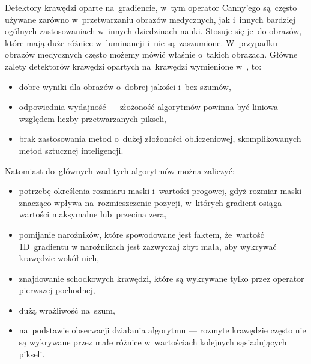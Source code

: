 \documentclass[a4paper,11pt,twoside,openright]{report}
\theoremstyle{definition}
\begin{document}
Detektory krawędzi oparte na~gradiencie, w~tym operator Canny'ego są~często używane
zarówno w~przetwarzaniu obrazów medycznych, jak i~innych bardziej ogólnych zastosowaniach
w~innych dziedzinach nauki. Stosuje się je~do obrazów, które mają duże różnice w~luminancji i~nie
są~zaszumione. W~przypadku obrazów medycznych często możemy mówić właśnie o~takich obrazach.
Główne zalety detektorów krawędzi opartych na~krawędzi
wymienione w~\cite{Cyfrowe przetwarzanie obrazów medycznych}, to:
\begin{itemize}[noitemsep]
\item dobre wyniki dla obrazów o~dobrej jakości i~bez szumów,
\item odpowiednia wydajność --- złożoność algorytmów powinna być liniowa względem liczby przetwarzanych pikseli,
\item brak zastosowania metod o~dużej złożoności obliczeniowej, skomplikowanych metod sztucznej inteligencji.
\end{itemize}

Natomiast do~głównych wad tych algorytmów można zaliczyć:
\begin{itemize}[noitemsep]
\item potrzebę określenia rozmiaru maski i~wartości progowej, gdyż rozmiar maski
znacząco wpływa na~rozmieszczenie pozycji, w~których gradient osiąga wartości
maksymalne lub~przecina zera,
\item pomijanie narożników, które spowodowane jest faktem, że~wartość 1D~gradientu
w narożnikach jest zazwyczaj zbyt mała, aby wykrywać krawędzie wokół nich,
\item znajdowanie schodkowych krawędzi, które są wykrywane tylko przez operator pierwszej pochodnej,
\item dużą wrażliwość na~szum,
\item na~podstawie obserwacji działania algorytmu --- rozmyte krawędzie często
nie są wykrywane przez małe różnice w~wartościach kolejnych sąsiadujących pikseli.
\end{itemize}
\end{document}
